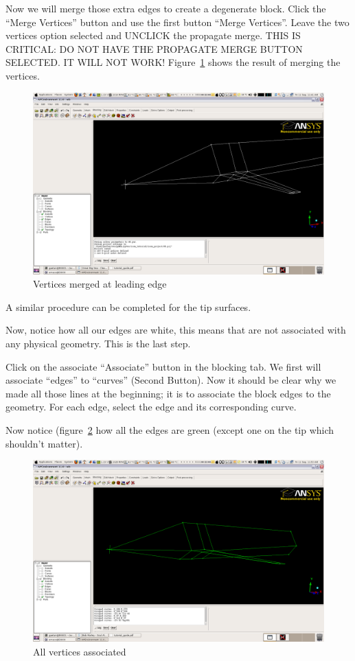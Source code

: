 \documentclass{report}
\begin{document}
Now we will merge those extra edges to create a degenerate block.
Click the ``Merge Vertices'' button and use the first button ``Merge Vertices''. Leave the two vertices option selected and UNCLICK the propagate merge. THIS IS CRITICAL: DO NOT HAVE THE PROPAGATE MERGE BUTTON SELECTED. IT WILL NOT WORK! Figure~\ref{fig:nose_merged} shows the result of merging the vertices.

\begin{figure}[htb]
  \centering
  \includegraphics[width=\textwidth,angle=0]{figures/fig13.png}
  \caption{Vertices merged at leading edge}
  \label{fig:nose_merged}
\end{figure}

A similar procedure can be completed for the tip surfaces. 

Now, notice how all our edges are white, this means that are not associated with any physical geometry. This is the last step.

Click on the associate ``Associate'' button in the blocking tab. We first will associate ``edges'' to ``curves'' (Second Button). Now it should be clear why we made all those lines at the beginning; it is to associate the block edges to the geometry. For each edge, select the edge and its corresponding curve. 

Now notice (figure~\ref{fig:green_curves} how all the edges are green (except one on the tip which shouldn't matter).
\begin{figure}[htb]
  \centering
  \includegraphics[width=\textwidth,angle=0]{figures/fig14.png}
  \caption{All vertices associated}
  \label{fig:green_curves}
\end{figure}
\end{document}
